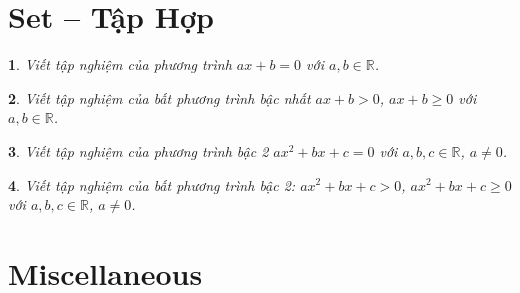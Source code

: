 \documentclass{article}
\newtheorem{baitoan}{}
\begin{document}

\section{Set -- Tập Hợp}

\begin{baitoan}
	Viết tập nghiệm của phương trình $ax + b = 0$ với $a,b\in\mathbb{R}$.
\end{baitoan}

\begin{baitoan}
	Viết tập nghiệm của bất phương trình bậc nhất $ax + b > 0$, $ax + b\ge0$ với $a,b\in\mathbb{R}$.
\end{baitoan}

\begin{baitoan}
	Viết tập nghiệm của phương trình bậc 2 $ax^2 + bx + c = 0$ với $a,b,c\in\mathbb{R}$, $a\ne0$.
\end{baitoan}

\begin{baitoan}
	Viết tập nghiệm của bất phương trình bậc 2: $ax^2 + bx + c > 0$, $ax^2 + bx + c\ge0$ với $a,b,c\in\mathbb{R}$, $a\ne0$.
\end{baitoan}


\section{Miscellaneous}


\printbibliography[heading=bibintoc]
	
\end{document}
